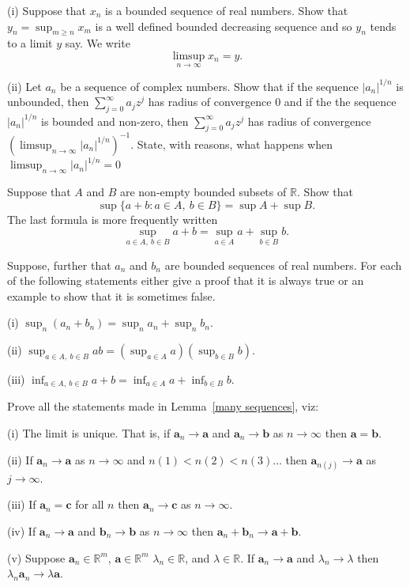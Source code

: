 \begin{question} (i) Suppose that  $x_{n}$ is a bounded
sequence of real
numbers. Show that $y_{n}=\sup_{m\geq n}x_{m}$
is a well defined bounded decreasing sequence
and so $y_{n}$ tends to a limit $y$ say. We
write
\[\limsup_{n\rightarrow\infty}x_{n}=y.\]

(ii) Let $a_{n}$ be a sequence of complex numbers.
Show that if the sequence $|a_{n}|^{1/n}$ is unbounded, then
$\sum_{j=0}^{\infty}a_{j}z^{j}$ has radius of convergence $0$
and if the the sequence $|a_{n}|^{1/n}$ is bounded and non-zero, then
$\sum_{j=0}^{\infty}a_{j}z^{j}$ has radius of convergence 
$(\limsup_{n\rightarrow\infty}|a_{n}|^{1/n})^{-1}$.
State, with reasons, what happens when 
$\limsup_{n\rightarrow\infty}|a_{n}|^{1/n}=0$

\end{question}
\begin{question}
Suppose that $A$ and $B$ are non-empty
bounded subsets of ${\mathbb R}$. Show that
\[\sup\{a+b:a\in A,\ b\in B\}=\sup A+\sup B.\]
The last formula is more frequently written
\[\sup_{a\in A,\ b\in B}a+b=\sup_{a\in A}a+\sup_{b\in B}b.\]

Suppose, further that $a_{n}$ and $b_{n}$ are bounded
sequences of real numbers. For each of the following
statements either give a proof that it is always true
or an example to show that it is sometimes false.

(i) $\sup_{n}(a_{n}+b_{n})=\sup_{n}a_{n}+\sup_{n}b_{n}$.

(ii) $\sup_{a\in A,\ b\in B}ab=(\sup_{a\in A}a)(\sup_{b\in B}b)$.

(iii) $\inf_{a\in A,\ b\in B}a+b=\inf_{a\in A}a+\inf_{b\in B}b$.

\end{question}
\begin{question}
Prove all the statements made
in Lemma~\ref{many sequences}, viz:

(i) The limit is unique. That is, if 
$\mathbf{a}_{n}\rightarrow \mathbf{a}$
and $\mathbf{a}_{n}\rightarrow \mathbf{b}$
as $n\rightarrow\infty$
then $\mathbf{a}=\mathbf{b}$.

(ii) If $\mathbf{a}_{n}\rightarrow \mathbf{a}$
as $n\rightarrow\infty$
and $n(1)<n(2)<n(3)\ldots$ then
$\mathbf{a}_{n(j)}\rightarrow \mathbf{a}$ 
as $j\rightarrow\infty$.

(iii) If $\mathbf{a}_{n}=\mathbf{c}$ for all $n$ 
then $\mathbf{a}_{n}\rightarrow \mathbf{c}$
as $n\rightarrow\infty$.

(iv) If $\mathbf{a}_{n}\rightarrow \mathbf{a}$
and $\mathbf{b}_{n}\rightarrow\mathbf{b}$
as $n\rightarrow\infty$ then
$\mathbf{a}_{n}+\mathbf{b}_{n}
\rightarrow \mathbf{a}+\mathbf{b}$.

(v) Suppose $\mathbf{a}_{n}\in {\mathbb R}^{m}$,
$\mathbf{a}\in {\mathbb R}^{m}$
$\lambda_{n}\in {\mathbb R}$,
and $\lambda\in {\mathbb R}$. 
If $\mathbf{a}_{n}\rightarrow \mathbf{a}$
and $\lambda_{n}\rightarrow\lambda$ then
$\lambda_{n}\mathbf{a}_{n}\rightarrow 
\lambda\mathbf{a}$.

\end{question}
